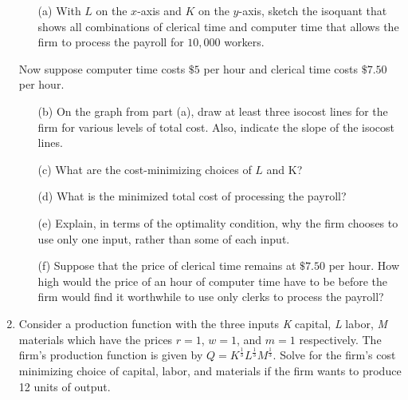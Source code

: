 \documentclass[11pt]{article}
\begin{document}
\begin{enumerate}
  \begin{enumerate}
    \item[(a)] With $L$ on the $x$-axis and $K$ on the $y$-axis, sketch the isoquant that shows all combinations of clerical time and computer time that allows the firm to process the payroll for $10,000$ workers.
  \end{enumerate}

  Now suppose computer time costs $\$5$ per hour and clerical time costs $\$7.50$ per hour.

  \begin{enumerate}
    \item[(b)] On the graph from part (a), draw at least three isocost lines for the firm for various levels of total cost. Also, indicate the slope of the isocost lines.

    \newpage
    \item[(c)] What are the cost-minimizing choices of $L$ and K?

    \vspace*{40mm}
    \item[(d)] What is the minimized total cost of processing the payroll?

    \vspace*{40mm}
    \item[(e)] Explain, in terms of the optimality condition, why the firm chooses to use only one input, rather than some of each input.

    \vspace*{40mm}
    \item[(f)] Suppose that the price of clerical time remains at $\$7.50$ per hour. How high would the price of an hour of computer time have to be before the firm would find it worthwhile to use only clerks to process the payroll?
  \end{enumerate}

    \newpage
    \item Consider a production function with the three inputs \emph{K} capital, \emph{L} labor, \emph{M} materials which have the prices $r = 1$, $w = 1$, and $m = 1$ respectively.  The firm's production function is given by $Q = K^{\frac{1}{3}}L^{\frac{1}{3}}M^{\frac{1}{3}}$. Solve for the firm's cost minimizing choice of capital, labor, and materials if the firm wants to produce 12 units of output.

\end{enumerate}
\end{document}
